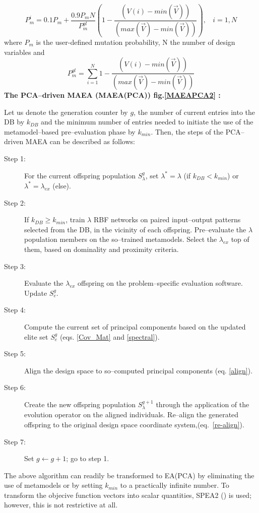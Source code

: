 \begin{equation} 
   P_m^{i}=0.1 P_m + \frac{0.9 P_m N}{P_m^{gl}} (1-\frac{(V(i)-min(\vec{V}))}{(max(\vec{V})-min(\vec{V}))}),~~~~i=1,N 
   \label{alignMut} %
\end{equation}
where $P_m$ is the user-defined mutation probability, N the number of design variables and 
\begin{equation} 
   P_m^{gl}=\sum^{N}_{i=1} 1-\frac{(V(i)-min(\vec{V}))}{(max(\vec{V})-min(\vec{V}))}
   \label{alignMut2} %
\end{equation}
{\bf The PCA--driven MAEA (MAEA(PCA)) fig.\ref{MAEAPCA2} :}

Let us denote the generation counter by $g$, the number of current entries into the DB by $k_{DB}$ and the minimum number of entries needed to initiate the use of the metamodel--based pre--evaluation phase by $k_{min}$. Then, the steps of the PCA--driven MAEA can be described as follows:
\begin{description}
  \item[Step 1:] For the current offspring population $S^{g}_\lambda$, set $\lambda^*\!=\!\lambda$ (if $k_{DB}\!<\!k_{min}$) or  $\lambda^*\!=\!\lambda_{ex}$ (else). 
  \item[Step 2:] If $k_{DB}\!\ge\!k_{min}$, train $\lambda$ RBF networks on paired input--output patterns selected from the DB, in the vicinity of each offspring. Pre--evaluate the $\lambda$ population members on the so--trained metamodels. Select the $\lambda_{ex}$ top of them, based on dominality and proximity criteria.
  \item[Step 3:] Evaluate the $\lambda_{ex}$ offspring on the problem--specific evaluation software. Update $S^{g}_e$.
  \item[Step 4:] Compute the current set of principal components based on the updated elite set $S^{g}_e$ (eqs. \ref{Cov_Mat} and \ref{spectral}).
  \item[Step 5:] Align the design space to so--computed principal components (eq. \ref{align}). 
  \item[Step 6:] Create the new offspring population $S^{g+1}_\lambda$ through the application of the evolution operator on the aligned individuals. Re--align the generated offspring to the original design space coordinate system,(eq.~\ref{re-align}).
  \item[Step 7:] Set $g\!\leftarrow\!g\!+\!1$; go to step 1.
\end{description}
The above algorithm can readily be transformed to EA(PCA) by eliminating the use of metamodels or by setting $k_{min}$ to a practically infinite number.  To transform the objecive function vectors into scalar quantities, SPEA2 (\cite{kn:Zitz02}) is used; however, this is not restrictive at all.

